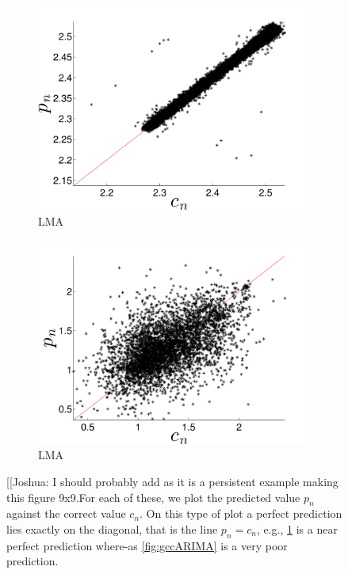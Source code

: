 \begin{figure}[htbp]
      \begin{subfigure}{0.48\columnwidth}
    \includegraphics[width=\columnwidth]{figs/colLMAForecast}
    \caption{\col LMA}
    \label{fig:colLMA}
  \end{subfigure}
      \begin{subfigure}{0.48\columnwidth}
    \includegraphics[width=\columnwidth]{figs/gccLMAForecast}
    \caption{\gcc LMA}
    \label{fig:gccLMA}
  \end{subfigure}  
   \caption{
{\color{red}[[Joshua: I should probably add \svdfive as it is a persistent example making this figure 9x9.}For each of these, we plot the predicted value $p_n$ against the correct value $c_n$. On this type of plot a perfect prediction lies exactly on the diagonal, that is the line $p_n = c_n$, e.g., \ref{fig:colLMA} is a near perfect prediction where-as \ref{fig:gccARIMA} is a very poor prediction. }\label{fig:gcc_vs_col}  
\end{figure} 
